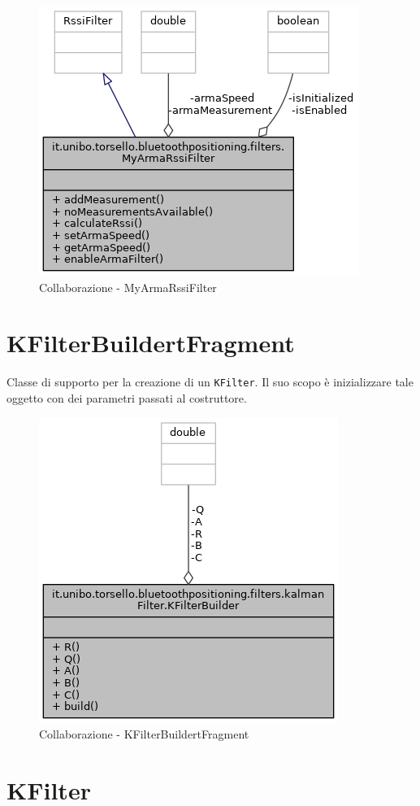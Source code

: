 \begin{figure}[ph]
	\centering
	\includegraphics[width=0.65\linewidth]{img/uml/class/classit_1_1unibo_1_1torsello_1_1bluetoothpositioning_1_1filters_1_1MyArmaRssiFilter__coll__graph.png}
	\caption{Collaborazione - MyArmaRssiFilter}
\end{figure}

\newpage
\section{KFilterBuildertFragment}
Classe di supporto per la creazione di un \texttt{KFilter}. Il suo scopo è inizializzare tale oggetto con dei parametri passati al costruttore.
\begin{figure}[ph]
	\centering
	\includegraphics[width=0.6\linewidth]{img/uml/class/classit_1_1unibo_1_1torsello_1_1bluetoothpositioning_1_1filters_1_1kalmanFilter_1_1KFilterBuilder__coll__graph.png}
	\caption{Collaborazione - KFilterBuildertFragment}
\end{figure}

\newpage
\section{KFilter}

